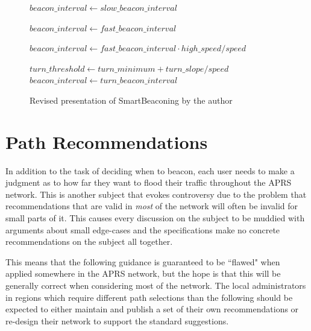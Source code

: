 \begin{figure}[p]
\begin{algorithmic}
	\State $beacon\_interval\gets slow\_beacon\_interval$

\Else
		\State $beacon\_interval\gets fast\_beacon\_interval$    

	\Else
		\State $beacon\_interval\gets fast\_beacon\_interval \cdot high\_speed / speed$

	\EndIf


	\State $turn\_threshold\gets turn\_minimum + turn\_slope / speed$
		\State $beacon\_interval\gets turn\_beacon\_interval$

	\EndIf
\EndIf

	\State {}

\EndIf
\end{algorithmic}
\caption{Revised presentation of SmartBeaconing by the author}
\label{fig:kwfsmartbeacon}
\end{figure}


\section{Path Recommendations}

In addition to the task of deciding when to beacon,
each user needs to make a judgment as to how far they want to flood their
traffic throughout the APRS network.
This is another subject that evokes controversy due to the problem that
recommendations that
are valid in \emph{most} of the network will often be invalid for small parts
of it.
This causes every discussion on the subject to be muddied with arguments
about small edge-cases and the specifications make no concrete recommendations
on the subject all together.

This means that the following guidance is guaranteed to be ``flawed" when
applied somewhere in the APRS network, but the hope is that this will
be generally correct when considering most of the network.
The local administrators in regions which require different path selections 
than the following should be expected to either 
maintain and publish a set of their own
recommendations or re-design their network to support the standard suggestions.

